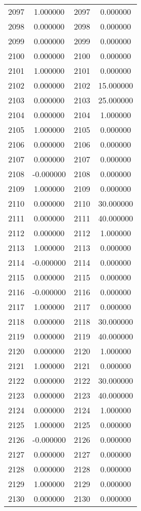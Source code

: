\documentclass[12pt]{article}
\begin{document}
\begin{longtable}{@{}cccc@{}}
2097 & 1.000000 & 2097 & 0.000000 \\
2098 & 0.000000 & 2098 & 0.000000 \\
2099 & 0.000000 & 2099 & 0.000000 \\
2100 & 0.000000 & 2100 & 0.000000 \\
2101 & 1.000000 & 2101 & 0.000000 \\
2102 & 0.000000 & 2102 & 15.000000 \\
2103 & 0.000000 & 2103 & 25.000000 \\
2104 & 0.000000 & 2104 & 1.000000 \\
2105 & 1.000000 & 2105 & 0.000000 \\
2106 & 0.000000 & 2106 & 0.000000 \\
2107 & 0.000000 & 2107 & 0.000000 \\
2108 & -0.000000 & 2108 & 0.000000 \\
2109 & 1.000000 & 2109 & 0.000000 \\
2110 & 0.000000 & 2110 & 30.000000 \\
2111 & 0.000000 & 2111 & 40.000000 \\
2112 & 0.000000 & 2112 & 1.000000 \\
2113 & 1.000000 & 2113 & 0.000000 \\
2114 & -0.000000 & 2114 & 0.000000 \\
2115 & 0.000000 & 2115 & 0.000000 \\
2116 & -0.000000 & 2116 & 0.000000 \\
2117 & 1.000000 & 2117 & 0.000000 \\
2118 & 0.000000 & 2118 & 30.000000 \\
2119 & 0.000000 & 2119 & 40.000000 \\
2120 & 0.000000 & 2120 & 1.000000 \\
2121 & 1.000000 & 2121 & 0.000000 \\
2122 & 0.000000 & 2122 & 30.000000 \\
2123 & 0.000000 & 2123 & 40.000000 \\
2124 & 0.000000 & 2124 & 1.000000 \\
2125 & 1.000000 & 2125 & 0.000000 \\
2126 & -0.000000 & 2126 & 0.000000 \\
2127 & 0.000000 & 2127 & 0.000000 \\
2128 & 0.000000 & 2128 & 0.000000 \\
2129 & 1.000000 & 2129 & 0.000000 \\
2130 & 0.000000 & 2130 & 0.000000 \\

\end{longtable}
\end{document}
